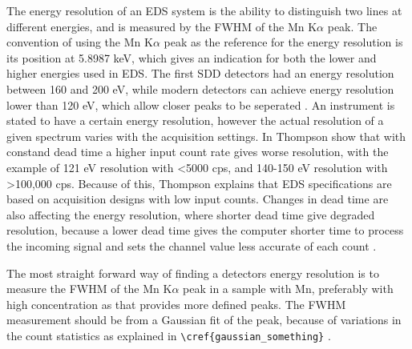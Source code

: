 The energy resolution of an EDS system is the ability to distinguish two lines at different energies, and is measured by the FWHM of the Mn K$\alpha$ peak.
The convention of using the Mn K$\alpha$ peak as the reference for the energy resolution is its position at 5.8987 keV, which gives an indication for both the lower and higher energies used in EDS.
The first SDD  detectors had an energy resolution between 160 and 200 eV, while modern detectors can achieve energy resolution lower than 120 eV, which allow closer peaks to be seperated \cite{keith_energy_res_2013} .
An instrument is stated to have a certain energy resolution, however the actual resolution of a given spectrum varies with the acquisition settings.
In \cite{keith_energy_res_2013} Thompson show that with constand dead time a higher input count rate gives worse resolution, with the example of 121 eV resolution with <5000 cps, and 140-150 eV resolution with >100,000 cps.
Because of this, Thompson explains that EDS specifications are based on acquisition designs with low input counts.
Changes in dead time are also affecting the energy resolution, where shorter dead time give degraded resolution, because a lower dead time gives the computer shorter time to process the incoming signal and sets the channel value less accurate of each count .





The most straight forward way of finding a detectors energy resolution is to measure the FWHM of the Mn K$\alpha$ peak in a sample with Mn, preferably with high concentration as that provides more defined peaks.
The FWHM measurement should be from a Gaussian fit of the peak, because of variations in the count statistics as explained in \verb|\cref{gaussian_something}| .



